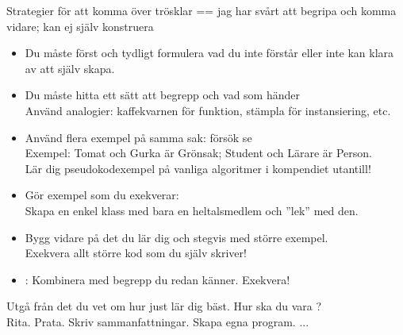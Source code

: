 \begin{Slide}{Strategier för att komma över trösklar}\SlideFontSmall
{} == jag har svårt att begripa och komma vidare; kan ej själv konstruera

\begin{itemize}\SlideFontTiny
\item Du måste först  och tydligt formulera vad du inte förstår eller inte kan klara av att själv skapa.

\item Du måste hitta ett sätt att  begrepp och  vad som händer \\
Använd analogier: kaffekvarnen för funktion, stämpla för instansiering, etc.

\item Använd flera exempel på samma sak: försök se  \\
Exempel: Tomat och Gurka är Grönsak; Student och Lärare är Person. \\ Lär dig pseudokodexempel på vanliga algoritmer i kompendiet utantill!

\item Gör  exempel som du exekverar: \\ Skapa en enkel klass med bara en heltalsmedlem och ''lek'' med den.

\item Bygg vidare på det du lär dig och  stegvis med större exempel.\\ Exekvera allt större kod som du själv skriver!

\item {}: Kombinera med begrepp du redan känner. Exekvera!

\end{itemize}
Utgå från det du vet om hur just  lär dig bäst. Hur ska du vara ? \\ Rita. Prata. Skriv sammanfattningar. Skapa egna program. ...
\end{Slide}

